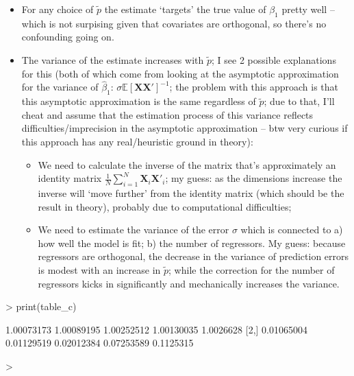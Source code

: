 \documentclass[a4paper,12pt,twoside]{article}
\begin{document}
\begin{itemize}
  \item For any choice of $\tilde p$ the estimate `targets' the true value of $\beta_1$ pretty well -- which is not surpising given that covariates are orthogonal, so there's no confounding going on.
  \item The variance of the estimate increases with $\tilde p$; I see 2 possible explanations for this (both of which come from looking at the asymptotic approximation for the variance of $\hat \beta_1$: $\sigma \mathbb{E} \left[ \mathbf{X} \mathbf{X}' \right]^{-1}$; the problem with this approach is that this asymptotic approximation is the same regardless of $\tilde p$; due to that, I'll cheat and assume that the estimation process of this variance reflects difficulties/imprecision in the asymptotic approximation -- btw very curious if this approach has any real/heuristic ground in theory):
  \begin{itemize}
    \item We need to calculate the inverse of the matrix that's approximately an identity matrix $\frac{1}{N} \sum_{i = 1}^N \mathbf{X}_i \mathbf{X}'_i$; my guess: as the dimensions increase the inverse will `move further' from the identity matrix (which should be the result in theory), probably due to computational difficulties;
    \item We need to estimate the variance of the error $\sigma$ which is connected to a) how well the model is fit; b) the number of regressors. My guess: because regressors are orthogonal, the decrease in the variance of prediction errors is modest with an increase in $\tilde p$; while the correction for the number of regressors kicks in significantly and mechanically increases the variance.
  \end{itemize}
\end{itemize}


\begin{Schunk}
\begin{Sinput}
> print(table_c)
\end{Sinput}
\begin{Soutput}
           [,1]       [,2]       [,3]       [,4]      [,5]
[1,] 1.00073173 1.00089195 1.00252512 1.00130035 1.0026628
[2,] 0.01065004 0.01129519 0.02012384 0.07253589 0.1125315
\end{Soutput}
\begin{Sinput}
> 
\end{Sinput}
\end{Schunk}
\end{document}
